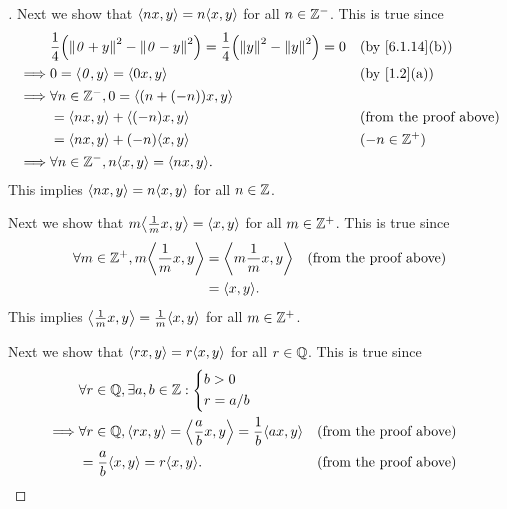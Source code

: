 \begin{proof}[]
	Next we show that \(\inn{nx, y} = n \inn{x, y}\) for all \(n \in \mathbb{Z}^-\).
	This is true since
	\begin{align*}
		         & \frac{1}{4} \pa{\norm{\zv + y}^2 - \norm{\zv - y}^2} = \frac{1}{4} \pa{\norm{y}^2 - \norm{y}^2} = 0 &  & \by{6.1.14}[b]                \\
		\implies & 0 = \inn{\zv, y} = \inn{0x, y}                                                                      &  & \by{1.2}[a]                   \\
		\implies & \forall n \in \Z^-, 0 = \inn{(n + (-n)) x, y}                                                                                          \\
		         & = \inn{nx, y} + \inn{(-n)x, y}                                                                      &  & \text{(from the proof above)} \\
		         & = \inn{nx, y} + (-n) \inn{x, y}                                                                     &  & (-n \in \Z^+)                 \\
		\implies & \forall n \in \Z^-, n \inn{x, y} = \inn{nx, y}.
	\end{align*}
	This implies \(\inn{nx, y} = n \inn{x, y}\) for all \(n \in \mathbb{Z}\).

	Next we show that \(m \inn{\frac{1}{m} x, y} = \inn{x, y}\) for all \(m \in \mathbb{Z}^+\).
	This is true since
	\begin{align*}
		\forall m \in \Z^+, m \inn{\frac{1}{m} x, y} & = \inn{m \frac{1}{m} x, y} &  & \text{(from the proof above)} \\
		                                             & = \inn{x, y}.
	\end{align*}
	This implies \(\inn{\frac{1}{m} x, y} = \frac{1}{m} \inn{x, y}\) for all \(m \in \mathbb{Z}^+\).

	Next we show that \(\inn{rx, y} = r \inn{x, y}\) for all \(r \in \mathbb{Q}\).
	This is true since
	\begin{align*}
		         & \forall r \in \Q, \exists a, b \in \Z : \begin{dcases}
			                                                   b > 0 \\
			                                                   r = a / b
		                                                   \end{dcases}                                                               \\
		\implies & \forall r \in \Q, \inn{rx, y} = \inn{\frac{a}{b} x, y} = \frac{1}{b} \inn{ax, y} &  & \text{(from the proof above)} \\
		         & = \frac{a}{b} \inn{x, y} = r \inn{x, y}.                                         &  & \text{(from the proof above)}
	\end{align*}


\end{proof}
